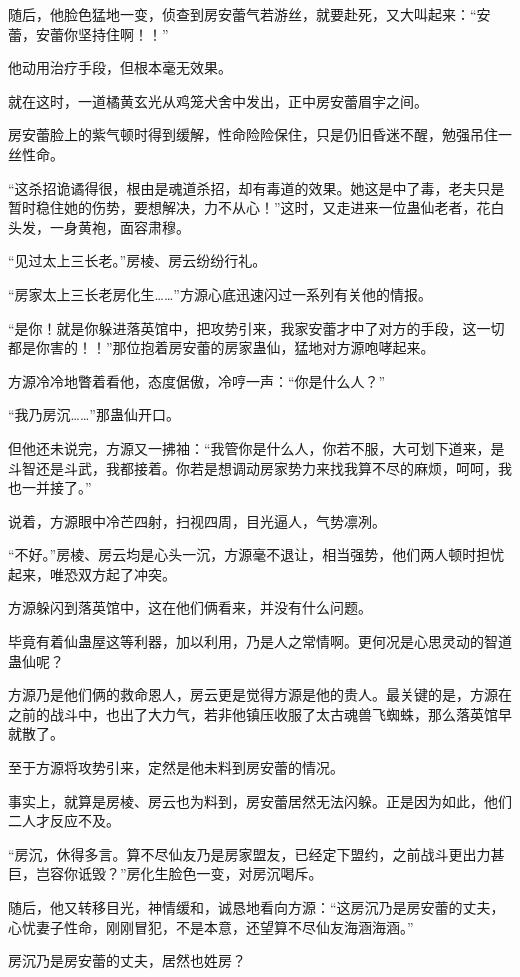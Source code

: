 \begin{this_body}
随后，他脸色猛地一变，侦查到房安蕾气若游丝，就要赴死，又大叫起来：“安蕾，安蕾你坚持住啊！！”

他动用治疗手段，但根本毫无效果。

就在这时，一道橘黄玄光从鸡笼犬舍中发出，正中房安蕾眉宇之间。

房安蕾脸上的紫气顿时得到缓解，性命险险保住，只是仍旧昏迷不醒，勉强吊住一丝性命。

“这杀招诡谲得很，根由是魂道杀招，却有毒道的效果。她这是中了毒，老夫只是暂时稳住她的伤势，要想解决，力不从心！”这时，又走进来一位蛊仙老者，花白头发，一身黄袍，面容肃穆。

“见过太上三长老。”房棱、房云纷纷行礼。

“房家太上三长老房化生……”方源心底迅速闪过一系列有关他的情报。

“是你！就是你躲进落英馆中，把攻势引来，我家安蕾才中了对方的手段，这一切都是你害的！！”那位抱着房安蕾的房家蛊仙，猛地对方源咆哮起来。

方源冷冷地瞥着看他，态度倨傲，冷哼一声：“你是什么人？”

“我乃房沉……”那蛊仙开口。

但他还未说完，方源又一拂袖：“我管你是什么人，你若不服，大可划下道来，是斗智还是斗武，我都接着。你若是想调动房家势力来找我算不尽的麻烦，呵呵，我也一并接了。”

说着，方源眼中冷芒四射，扫视四周，目光逼人，气势凛冽。

“不好。”房棱、房云均是心头一沉，方源毫不退让，相当强势，他们两人顿时担忧起来，唯恐双方起了冲突。

方源躲闪到落英馆中，这在他们俩看来，并没有什么问题。

毕竟有着仙蛊屋这等利器，加以利用，乃是人之常情啊。更何况是心思灵动的智道蛊仙呢？

方源乃是他们俩的救命恩人，房云更是觉得方源是他的贵人。最关键的是，方源在之前的战斗中，也出了大力气，若非他镇压收服了太古魂兽飞蜘蛛，那么落英馆早就散了。

至于方源将攻势引来，定然是他未料到房安蕾的情况。

事实上，就算是房棱、房云也为料到，房安蕾居然无法闪躲。正是因为如此，他们二人才反应不及。

“房沉，休得多言。算不尽仙友乃是房家盟友，已经定下盟约，之前战斗更出力甚巨，岂容你诋毁？”房化生脸色一变，对房沉喝斥。

随后，他又转移目光，神情缓和，诚恳地看向方源：“这房沉乃是房安蕾的丈夫，心忧妻子性命，刚刚冒犯，不是本意，还望算不尽仙友海涵海涵。”

房沉乃是房安蕾的丈夫，居然也姓房？


\end{this_body}
